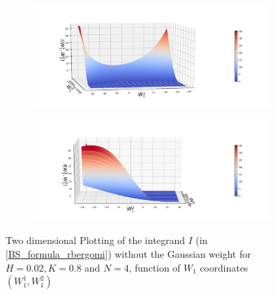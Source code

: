 \documentclass[11pt]{article}
\begin{document}
\begin{figure}[h!]
\centering
\begin{subfigure}{.4\textwidth}
\centering
\includegraphics[width=1\linewidth]{./figures/integrand_plotting_rBergomi/2D_plots/N_4/integrand_without_density/H_002/Bergomi_integrand_contours_K_08_H_002_W1_1_2_N_4_without_weights_2_80}
\caption{}
\label{fig:sub3}
\end{subfigure}%
\begin{subfigure}{.4\textwidth}
\centering
\includegraphics[width=1\linewidth]{./figures/integrand_plotting_rBergomi/2D_plots/N_4/integrand_without_density/H_002/Bergomi_integrand_contours_K_08_H_002_W1_1_2_N_4_without_weights_2_0}
\caption{}
\label{fig:sub4}
\end{subfigure}



\caption{Two dimensional Plotting of the integrand $I$ (in \eqref{BS_formula_rbergomi}) without the Gaussian weight  for $H=0.02, K=0.8$ and $N=4$, function of $W_1$ coordinates $(W_1^1,W^2_1)$}
\label{fig:Two dimensional Plotting of the integrand $I$_W12_view_set16}
\end{figure}
\FloatBarrier
\end{document}
